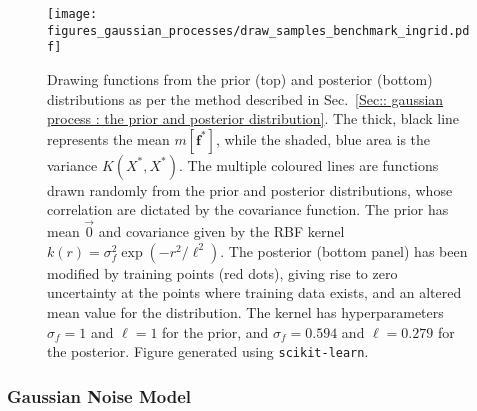 \documentclass[twoside,english]{uiofysmaster}
\begin{document}
{{\begin{figure}
\centering
\texttt{[image: figures\_gaussian\_processes/draw\_samples\_benchmark\_ingrid.pdf]}
\caption{Drawing functions from the prior (top) and posterior (bottom) distributions as per the method described in Sec.~\ref{Sec:: gaussian process : the prior and posterior distribution}. The thick, black line represents the mean $m[\textbf{f}^*]$, while the shaded, blue area is the variance $K(X^*, X^*)$. The multiple coloured lines are functions drawn randomly from the prior and posterior distributions, whose correlation are dictated by the covariance function. The prior has mean $\vec{0}$ and covariance given by the RBF kernel $k(r) = \sigma_f^2 \exp(-r^2/\ell^2)$. The posterior (bottom panel) has been modified by training points (red dots), giving rise to zero uncertainty at the points where training data exists, and an altered mean value for the distribution. The kernel has hyperparameters $\sigma_f = 1$ and $\ell = 1$ for the prior, and $\sigma_f = 0.594$ and $\ell = 0.279$ for the posterior. Figure generated using {\tt scikit-learn}.}
\label{Fig:: gaussian process : prior posterior drawn samples}
\end{figure}

\subsubsection{Gaussian Noise Model}\label{Sec: gaussian process : Gaussian Noise Model}

}}
\end{document}
